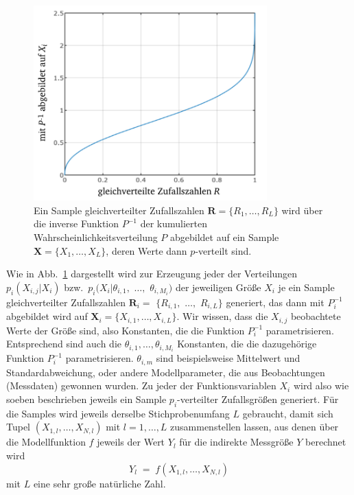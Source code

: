 \begin{figure}
\begin{center}
\includegraphics[width=90mm]{09_vorlesung/media/Zufallszahlen_abbilden_Verteilung.pdf}
\caption{\label{ZufallszahlenAbbilden} Ein Sample gleichverteilter Zufallszahlen
$\boldsymbol R = \{R_1, \dots, R_L\}$ wird über die inverse Funktion $P^{-1}$ der
kumulierten Wahrscheinlichkeitsverteilung $P$ abgebildet auf ein
Sample $\boldsymbol X = \{X_1, \dots, X_L\}$, deren Werte dann $p$-verteilt sind.}
\end{center}
\end{figure}
Wie in Abb.~\ref{ZufallszahlenAbbilden} dargestellt wird zur Erzeugung jeder der Verteilungen
$p_i (X_{i,j} | X_i)$ bzw.\ $p_i (X_i | \theta_{i,1},$ $\dots,$ $\theta_{i,M_i})$ der jeweiligen Größe
$X_i$ je ein Sample gleichverteilter Zufallszahlen $\boldsymbol R_i =$ $\{R_{i,1},$ $\dots,$ $R_{i,L}\}$ generiert, das
dann mit $P_i^{-1}$ abgebildet wird auf $\boldsymbol X_i = \{X_{i,1}, \dots, X_{i,L}\}$.
Wir wissen, dass die $X_{i,j}$ beobachtete Werte der Größe sind, also Konstanten, die die Funktion
$P_i^{-1}$ parametrisieren. Entsprechend sind auch die $\theta_{i,1}, \dots, \theta_{i,M_i}$ Konstanten, die
die dazugehörige Funktion $P_i^{-1}$ parametrisieren. $\theta_{i,m}$ sind beispielsweise Mittelwert und
Standardabweichung, oder andere Modellparameter, die aus Beobachtungen (Messdaten) gewonnen wurden.
Zu jeder der Funktionsvariablen $X_i$ wird also wie soeben beschrieben jeweils ein Sample $p_i$-verteilter
Zufallsgrößen generiert. Für die Samples wird jeweils derselbe Stichprobenumfang $L$ gebraucht, damit
sich Tupel $(X_{1,l}, \dots, X_{N,l})$ mit $l = 1,\dots, L$ zusammenstellen lassen, aus denen über die
Modellfunktion $f$ jeweils der Wert $Y_l$ für die indirekte Messgröße $Y$ berechnet wird
\begin{equation}
Y_l \; = \; f(X_{1,l}, \dots, X_{N,l})
\end{equation}
mit $L$ eine sehr große natürliche Zahl.

